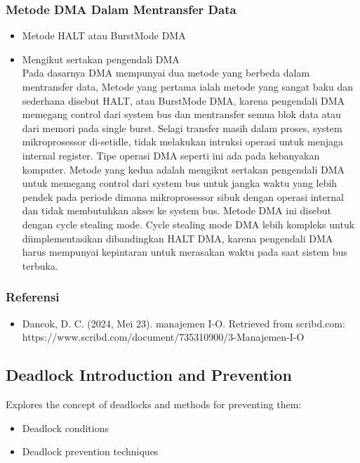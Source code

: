 \documentclass[12pt]{article}
\begin{document}
\subsubsection{Metode DMA Dalam Mentransfer Data}
\begin{itemize}
    \item Metode HALT atau BurstMode DMA
    \item Mengikut sertakan pengendali DMA \\
    Pada dasarnya DMA mempunyai dua metode yang berbeda dalam mentransfer data, Metode yang pertama ialah metode yang sangat baku dan sederhana disebut HALT, atau BurstMode DMA, karena pengendali DMA memegang control dari system bus dan mentransfer semua blok data atau dari memori pada single burst. Selagi transfer masih dalam proses, system mikroprosessor di-setidle, tidak melakukan intruksi operasi untuk menjaga internal register. Tipe operasi DMA seperti ini ada pada kebanyakan komputer. Metode yang kedua adalah mengikut sertakan pengendali DMA untuk memegang control dari system bus untuk jangka waktu yang lebih pendek pada periode dimana mikroprosessor sibuk dengan operasi internal dan tidak membutuhkan akses ke system bus. Metode DMA ini disebut dengan cycle stealing mode. Cycle stealing mode DMA lebih kompleks untuk diimplementasikan dibandingkan HALT DMA, karena pengendali DMA harus mempunyai kepintaran untuk merasakan waktu pada saat sistem bus terbuka.
\end{itemize}

\subsubsection{Referensi}
\begin{itemize}
    \item Dancok, D. C. (2024, Mei 23). manajemen I-O. Retrieved from scribd.com: https://www.scribd.com/document/735310900/3-Manajemen-I-O 
\end{itemize}

\subsection{Deadlock Introduction and Prevention}
Explores the concept of deadlocks and methods for preventing them:
\begin{itemize}
    \item Deadlock conditions
    \item Deadlock prevention techniques
\end{itemize}
\end{document}
